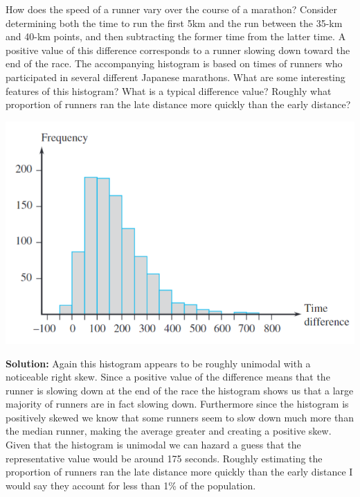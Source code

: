 \documentclass[12pt]{article}
\makeatletter
\theoremstyle{homework}
\newenvironment{exercise}[1]
{\def\@currentlabel{#1}\exercisecore}
{\endexercisecore}
\makeatother
\begin{document}
\begin{exercise}{1.22} How does the speed of a runner vary over the course of a marathon? Consider determining both the time to run the first 5km and 
  the run between the 35-km and 40-km points, and then subtracting the former time from the latter time. A positive value of this difference corresponds to a runner slowing down toward the end of the race.
  The accompanying histogram is based on times of runners who participated in several different Japanese marathons. What are some interesting features of this histogram?
  What is a typical difference value? Roughly what proportion of runners ran the late distance more quickly than the early distance?\\
  \begin{center}
    \includegraphics[width=\textwidth]{hist2.png}      
  \end{center}
  
  \textbf{Solution:}
  Again this histogram appears to be roughly unimodal with a noticeable right skew. Since a positive value of the difference means that the runner is slowing down 
  at the end of the race the histogram shows us that a large majority of runners are in fact slowing down. Furthermore since the histogram is positively skewed we know that
  some runners seem to slow down much more than the median runner, making the average greater and creating a positive skew. Given that the histogram is unimodal we can hazard a guess that the 
  representative value would be around 175 seconds. Roughly estimating the proportion of runners ran the late distance more quickly than the early distance I would say they account for less than 1\% of the population.

\end{exercise}
\vspace{1in}
\end{document}
